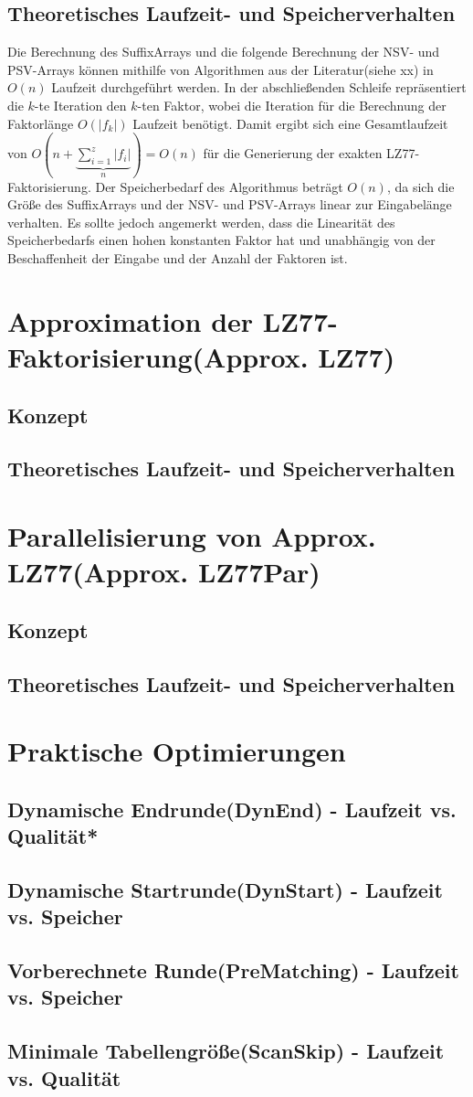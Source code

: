 \subsection{Theoretisches Laufzeit- und Speicherverhalten}
Die Berechnung des SuffixArrays und die folgende Berechnung der NSV- und PSV-Arrays können mithilfe von Algorithmen aus der Literatur(siehe xx) in $O(n)$ Laufzeit 
durchgeführt werden. In der abschließenden Schleife repräsentiert die $k$-te Iteration den $k$-ten Faktor, wobei die Iteration für die Berechnung der Faktorlänge
$O(|f_k|)$ Laufzeit benötigt. Damit ergibt sich eine Gesamtlaufzeit von $O(n +\underbrace{\sum_{i=1}^{z} |f_i|}_{n}) = O(n)$ für die Generierung der exakten LZ77-Faktorisierung.
Der Speicherbedarf des Algorithmus beträgt $O(n)$, da sich die Größe des SuffixArrays und der NSV- und PSV-Arrays linear zur Eingabelänge verhalten. Es sollte jedoch
angemerkt werden, dass die Linearität des Speicherbedarfs einen hohen konstanten Faktor hat und unabhängig von der Beschaffenheit der Eingabe und der Anzahl der Faktoren ist.

\section{Approximation der LZ77-Faktorisierung(Approx. LZ77)}
\subsection{Konzept}
\subsection{Theoretisches Laufzeit- und Speicherverhalten}

\section{Parallelisierung von Approx. LZ77(Approx. LZ77Par)}
\subsection{Konzept}
\subsection{Theoretisches Laufzeit- und Speicherverhalten}

\section{Praktische Optimierungen}
\subsection{Dynamische Endrunde(DynEnd) - Laufzeit vs. Qualität*}
\subsection{Dynamische Startrunde(DynStart) - Laufzeit vs. Speicher}
\subsection{Vorberechnete Runde(PreMatching) - Laufzeit vs. Speicher}
\subsection{Minimale Tabellengröße(ScanSkip) - Laufzeit vs. Qualität}
